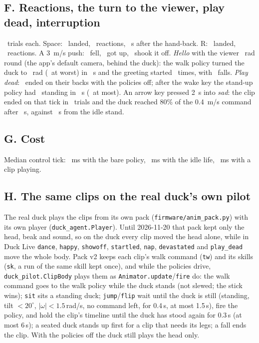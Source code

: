 \documentclass[11pt]{article}
\newcommand{\code}[1]{\texttt{\small #1}}
\begin{document}
\subsection{F. Reactions, the turn to the viewer, play dead, interruption}
\reactN~trials each. Space: \reactJumpLanded~landed, \reactJump~reactions, \reactJumpT~s after the hand-back. R:
\reactFlipLanded~landed, \reactFlip~reactions. A 3~m/s push: \reactFell~fell, \reactUp~got up, \reactShook~shook
it off. \emph{Hello} with the viewer \faceYawA~rad round (the app's default camera, behind the duck): the walk policy
turned the duck to \faceYawB~rad (\faceYawBmax~at worst) in \faceT~s and the greeting started \faceOk~times, with
\faceFalls~falls. \emph{Play dead}: \deadN~ended on their backs with the policies off; after the wake key the
stand-up policy had \deadUp~standing in \deadT~s (\deadTmax~at most). An arrow key pressed 2~s into \emph{sad}: the
clip ended on that tick in \cutOk~trials and the duck reached 80\% of the 0.4~m/s command after \cutClip~s, against
\cutNone~s from the idle stand.

\subsection{G. Cost}
Median control tick: \costBare~ms with the bare policy, \costLive~ms with the idle life, \costClip~ms with a clip
playing.

\subsection{H. The same clips on the real duck's own pilot}\label{sec:exp:duck}
The real duck plays the clips from its own pack (\code{firmware/anim\_pack.py}) with its own player
(\code{duck\_agent.Player}). Until 2026-11-20 that pack kept only the head, beak and sound, so on the duck every clip
moved the head alone, while in Duck Live \code{dance}, \code{happy}, \code{showoff}, \code{startled}, \code{nap},
\code{devastated} and \code{play\_dead} move the whole body. Pack v2 keeps each clip's walk command (\code{tw}) and
its skills (\code{sk}, a run of the same skill kept once), and while the policies drive, \code{duck\_pilot.ClipBody}
plays them as \code{Animator.update}/\code{fire} do: the walk command goes to the walk policy while the duck stands
(not slewed; the stick wins); \code{sit} sits a standing duck; \code{jump}/\code{flip} wait until the duck is still
(standing, tilt $<20^\circ$, $|\omega|<1.5$\,rad/s, no command left, for 0.4\,s, at most 1.5\,s), fire the policy, and
hold the clip's timeline until the duck has stood again for 0.3\,s (at most 6\,s); a seated duck stands up first for
a clip that needs its legs; a fall ends the clip. With the policies off the duck still plays the head only.
\end{document}
